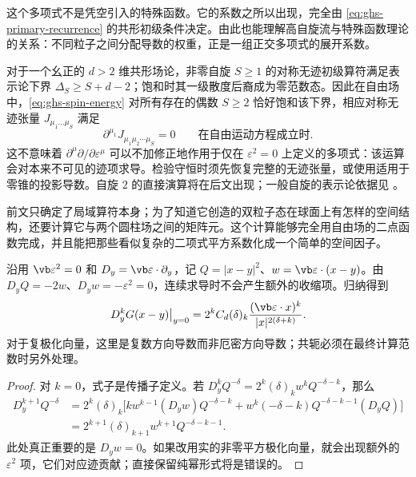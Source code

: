 这个多项式不是凭空引入的特殊函数。它的系数之所以出现，完全由 \cref{eq:ghs-primary-recurrence} 的共形初级条件决定。由此也能理解高自旋流与特殊函数理论的关系：不同粒子之间分配导数的权重，正是一组正交多项式的展开系数。


对于一个幺正的 $d>2$ 维共形场论，非零自旋 $S\ge1$ 的对称无迹初级算符满足表示论下界 $\Delta_S\ge S+d-2$；饱和时其一级散度后裔成为零范数态。因此在自由场中，\cref{eq:ghs-spin-energy} 对所有存在的偶数 $S\ge2$ 恰好饱和该下界，相应对称无迹张量 $J_{\mu_1\ldots\mu_S}$ 满足
\begin{equation}\label{eq:ghs-higher-spin-conservation}
 \partial^{\mu_1}J_{\mu_1\mu_2\cdots\mu_S}=0
 \qquad\text{在自由运动方程成立时}.
\end{equation}
这不意味着 $\partial^\mu\partial/\partial\varepsilon^\mu$ 可以不加修正地作用于仅在 $\varepsilon^2=0$ 上定义的多项式：该运算会对本来不可见的迹项求导。检验守恒时须先恢复完整的无迹张量，或使用适用于零锥的投影导数。自旋 $2$ 的直接演算将在后文出现；一般自旋的表示论依据见 \cite{ghs-rychkov,ghs-simmons}。


前文只确定了局域算符本身；为了知道它创造的双粒子态在球面上有怎样的空间结构，还要计算它与两个圆柱场之间的矩阵元。这个计算能够完全用自由场的二点函数完成，并且能把那些看似复杂的二项式平方系数化成一个简单的空间因子。


\begin{lemma}[零极化导数的传播核]
沿用 $\vb\varepsilon^2=0$ 和 $D_y=\vb\varepsilon\cdot\partial_y$，记 $Q=|x-y|^2$、$w=\vb\varepsilon\cdot(x-y)$。由 $D_yQ=-2w$、$D_yw=-\varepsilon^2=0$，连续求导时不会产生额外的收缩项。归纳得到
\begin{equation}\label{eq:ghs-null-derivative-G}
 \left.D_y^kG(x-y)\right|_{y=0}
 =2^kC_d(\delta)_k\frac{(\vb\varepsilon\cdot x)^k}{|x|^{2(\delta+k)}}.
\end{equation}
对于复极化向量，这里是复数方向导数而非厄密方向导数；共轭必须在最终计算范数时另外处理。
\end{lemma}

\begin{proof}
对 $k=0$，式子是传播子定义。若 $D_y^k Q^{-\delta}=2^k(\delta)_k w^kQ^{-\delta-k}$，那么
\begin{align*}
D_y^{k+1}Q^{-\delta}
&=2^k(\delta)_k\bigl[k w^{k-1}(D_yw)Q^{-\delta-k}
+w^k(-\delta-k)Q^{-\delta-k-1}(D_yQ)\bigr]\\
&=2^{k+1}(\delta)_{k+1}w^{k+1}Q^{-\delta-k-1}.
\end{align*}
此处真正重要的是 $D_yw=0$。如果改用实的非零平方极化向量，就会出现额外的 $\varepsilon^2$ 项，它们对应迹贡献；直接保留纯幂形式将是错误的。
\end{proof}

